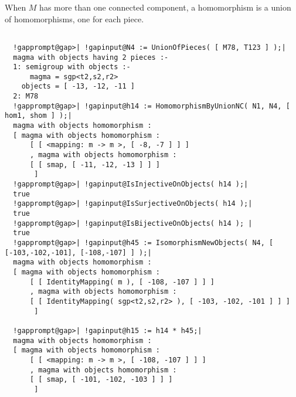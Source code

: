 \documentclass[a4paper,11pt]{report}
\begin{document}
{{{ When $M$ has more than one connected component, a homomorphism is a union of
homomorphisms, one for each piece. }

 
\begin{Verbatim}[commandchars=!@|,fontsize=\small,frame=single,label=Example]
  
  !gapprompt@gap>| !gapinput@N4 := UnionOfPieces( [ M78, T123 ] );|
  magma with objects having 2 pieces :-
  1: semigroup with objects :-
      magma = sgp<t2,s2,r2>
    objects = [ -13, -12, -11 ]
  2: M78
  !gapprompt@gap>| !gapinput@h14 := HomomorphismByUnionNC( N1, N4, [ hom1, shom ] );|
  magma with objects homomorphism : 
  [ magma with objects homomorphism : 
      [ [ <mapping: m -> m >, [ -8, -7 ] ] ]
      , magma with objects homomorphism : 
      [ [ smap, [ -11, -12, -13 ] ] ]
       ]
  !gapprompt@gap>| !gapinput@IsInjectiveOnObjects( h14 );|
  true
  !gapprompt@gap>| !gapinput@IsSurjectiveOnObjects( h14 );|
  true
  !gapprompt@gap>| !gapinput@IsBijectiveOnObjects( h14 ); |
  true
  !gapprompt@gap>| !gapinput@h45 := IsomorphismNewObjects( N4, [ [-103,-102,-101], [-108,-107] ] );|
  magma with objects homomorphism : 
  [ magma with objects homomorphism : 
      [ [ IdentityMapping( m ), [ -108, -107 ] ] ]
      , magma with objects homomorphism : 
      [ [ IdentityMapping( sgp<t2,s2,r2> ), [ -103, -102, -101 ] ] ]
       ]
  
  !gapprompt@gap>| !gapinput@h15 := h14 * h45;|
  magma with objects homomorphism : 
  [ magma with objects homomorphism : 
      [ [ <mapping: m -> m >, [ -108, -107 ] ] ]
      , magma with objects homomorphism : 
      [ [ smap, [ -101, -102, -103 ] ] ]
       ]
  
  
\end{Verbatim}
 }

 }

            
\end{document}
